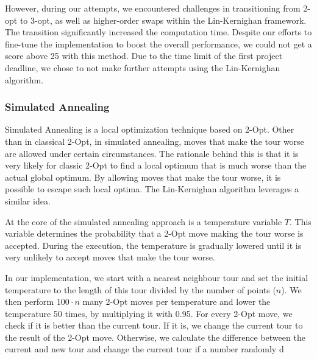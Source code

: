 \documentclass{article}
\begin{document}
However, during our attempts, we encountered challenges in transitioning from 2-opt to 3-opt, as well as higher-order swaps within the Lin-Kernighan framework. The transition significantly increased the computation time. Despite our efforts to fine-tune the implementation to boost the overall performance, we could not get a score above 25 with this method. Due to the time limit of the first project deadline, we chose to not make further attempts using the Lin-Kernighan algorithm.


\subsubsection{Simulated Annealing} \label{sec:simlatedAnnealing}
Simulated Annealing is a local optimization technique based on 2-Opt. Other than in classical 2-Opt, in simulated annealing, moves that make the tour worse are allowed under certain circumstances. The rationale behind this is that it is very likely for classic 2-Opt to find a local optimum that is much worse than the actual global optimum. By allowing moves that make the tour worse, it is possible to escape such local optima. The Lin-Kernighan algorithm leverages a similar idea.

At the core of the simulated annealing approach is a temperature variable $T$. This variable determines the probability that a 2-Opt move making the tour worse is accepted. During the execution, the temperature is gradually lowered until it is very unlikely to accept moves that make the tour worse.

In our implementation, we start with a nearest neighbour tour and set the initial temperature to the length of this tour divided by the number of points ($n$). We then perform \(100 \cdot n\) many 2-Opt moves per temperature and lower the temperature 50 times, by multiplying it with 0.95. For every 2-Opt move, we check if it is better than the current tour. If it is, we change the current tour to the result of the 2-Opt move. Otherwise, we calculate the difference between the current and new tour and change the current tour if a number randomly d
\end{document}
